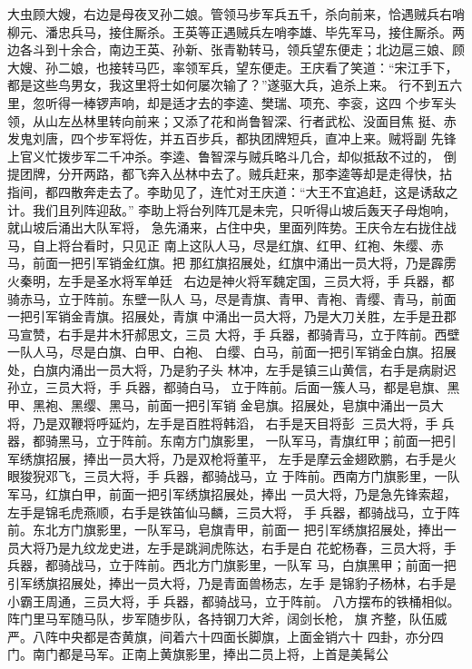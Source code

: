 大虫顾大嫂，右边是母夜叉孙二娘。管领马步军兵五千，杀向前来，恰遇贼兵右哨
柳元、潘忠兵马，接住厮杀。王英等正遇贼兵左哨李雄、毕先军马，接住厮杀。两
边各斗到十余合，南边王英、孙新、张青勒转马，领兵望东便走；北边扈三娘、顾
大嫂、孙二娘，也接转马匹，率领军兵，望东便走。王庆看了笑道：“宋江手下，
都是这些鸟男女，我这里将士如何屡次输了？”遂驱大兵，追杀上来。
行不到五六里，忽听得一棒锣声响，却是适才去的李逵、樊瑞、项充、李衮，这四
个步军头领，从山左丛林里转向前来；又添了花和尚鲁智深、行者武松、没面目焦
挺、赤发鬼刘唐，四个步军将佐，并五百步兵，都执团牌短兵，直冲上来。贼将副
先锋上官义忙拨步军二千冲杀。李逵、鲁智深与贼兵略斗几合，却似抵敌不过的，
倒提团牌，分开两路，都飞奔入丛林中去了。贼兵赶来，那李逵等却是走得快，拈
指间，都四散奔走去了。李助见了，连忙对王庆道：“大王不宜追赶，这是诱敌之
计。我们且列阵迎敌。”
李助上将台列阵兀是未完，只听得山坡后轰天子母炮响，就山坡后涌出大队军将，
急先涌来，占住中央，里面列阵势。王庆令左右拢住战马，自上将台看时，只见正
南上这队人马，尽是红旗、红甲、红袍、朱缨、赤马，前面一把引军销金红旗。把
那红旗招展处，红旗中涌出一员大将，乃是霹雳火秦明，左手是圣水将军单廷，
右边是神火将军魏定国，三员大将，手兵器，都骑赤马，立于阵前。东壁一队人
马，尽是青旗、青甲、青袍、青缨、青马，前面一把引军销金青旗。招展处，青旗
中涌出一员大将，乃是大刀关胜，左手是丑郡马宣赞，右手是井木犴郝思文，三员
大将，手兵器，都骑青马，立于阵前。西壁一队人马，尽是白旗、白甲、白袍、
白缨、白马，前面一把引军销金白旗。招展处，白旗内涌出一员大将，乃是豹子头
林冲，左手是镇三山黄信，右手是病尉迟孙立，三员大将，手兵器，都骑白马，
立于阵前。后面一簇人马，都是皂旗、黑甲、黑袍、黑缨、黑马，前面一把引军销
金皂旗。招展处，皂旗中涌出一员大将，乃是双鞭将呼延灼，左手是百胜将韩滔，
右手是天目将彭，三员大将，手兵器，都骑黑马，立于阵前。东南方门旗影里，
一队军马，青旗红甲；前面一把引军绣旗招展，捧出一员大将，乃是双枪将董平，
左手是摩云金翅欧鹏，右手是火眼狻猊邓飞，三员大将，手兵器，都骑战马，立
于阵前。西南方门旗影里，一队军马，红旗白甲，前面一把引军绣旗招展处，捧出
一员大将，乃是急先锋索超，左手是锦毛虎燕顺，右手是铁笛仙马麟，三员大将，
手兵器，都骑战马，立于阵前。东北方门旗影里，一队军马，皂旗青甲，前面一
把引军绣旗招展处，捧出一员大将乃是九纹龙史进，左手是跳涧虎陈达，右手是白
花蛇杨春，三员大将，手兵器，都骑战马，立于阵前。西北方门旗影里，一队军
马，白旗黑甲；前面一把引军绣旗招展处，捧出一员大将，乃是青面兽杨志，左手
是锦豹子杨林，右手是小霸王周通，三员大将，手兵器，都骑战马，立于阵前。
八方摆布的铁桶相似。阵门里马军随马队，步军随步队，各持钢刀大斧，阔剑长枪，
旗齐整，队伍威严。八阵中央都是杏黄旗，间着六十四面长脚旗，上面金销六十
四卦，亦分四门。南门都是马军。正南上黄旗影里，捧出二员上将，上首是美髯公

